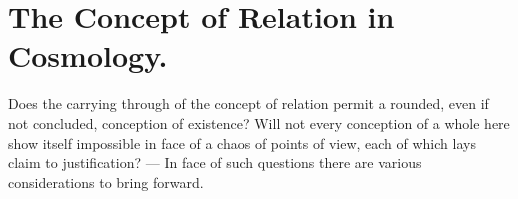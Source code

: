 \documentclass[12pt]{article}
\newcommand{\opage}[1]{\marginnote{\footnotesize\textit{[#1]}}}
\begin{document}

\section{The Concept of Relation in Cosmology.}
\label{sec:5}
%

\opage{99}Does the carrying through of the concept of relation permit a rounded, even
if not concluded, conception of existence? Will not every conception of a
whole here show itself impossible in face of a chaos of points of view, each
of which lays claim to justification? --- In face of such questions there
are various considerations to bring forward.
\end{document}
